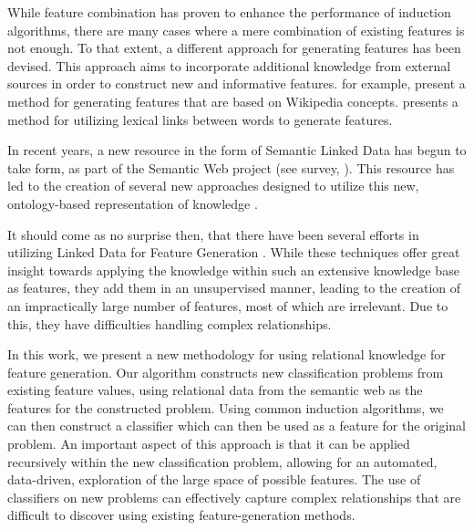 \documentclass{article}
\theoremstyle{definition}
\begin{document}
While feature combination has proven to enhance the performance of induction algorithms, there are many cases where a mere combination of existing features is not enough.  To that extent, a different approach for generating features has been devised.  This approach aims to incorporate additional knowledge from external sources in order to construct new and informative features.
\citet{gabrilovich2009wikipedia} for example, present a method for generating features that are based on Wikipedia concepts. \citet{jarmasz2012roget} presents a method for utilizing lexical links between words to generate features.

In recent years, a new resource in the form of Semantic Linked Data has begun to take form, as part of the Semantic Web project (see survey, \citet{bizer2009linked}). This resource has led to the creation of several new approaches designed to utilize this new, ontology-based representation of knowledge \citep{losch2012graph,rios2014statistical}.

It should come as no surprise then, that there have been several efforts in utilizing Linked Data for Feature Generation \citep{cheng2011automated, paulheim2012unsupervised}. While these techniques offer great insight towards applying the knowledge within such an extensive knowledge base as features, they add them in an unsupervised manner, leading to the creation of an impractically large number of features, most of which are irrelevant. Due to this, they have difficulties handling complex relationships.


In this work, we present a new methodology for using relational knowledge for feature generation.  Our algorithm constructs new classification problems from existing feature values, using relational data from the semantic web as the features for the constructed problem.
Using common induction algorithms, we can then construct a classifier which can then be used as a feature for the original problem. An important aspect of this approach is that it can be applied recursively within the new classification problem, allowing for an automated, data-driven, exploration of the large space of possible features.
The use of classifiers on new problems can effectively capture complex relationships that are difficult to discover using existing feature-generation methods.
\end{document}
